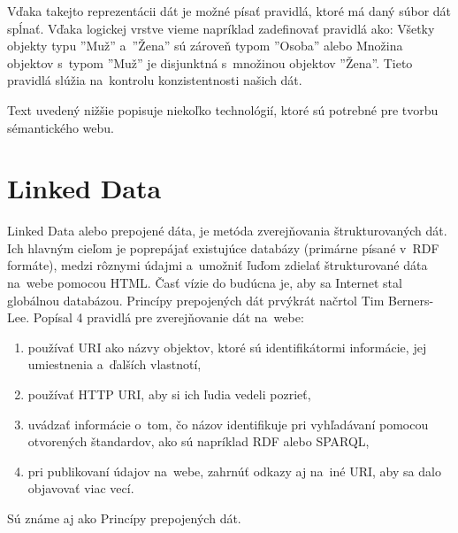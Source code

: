\documentclass[12pt, a4paper, oneside]{book}
\begin{document}
Vďaka takejto reprezentácii dát je možné písať pravidlá, ktoré má daný súbor dát spĺnať. Vďaka logickej vrstve vieme napríklad zadefinovať pravidlá ako: Všetky objekty typu ''Muž'' a~''Žena'' sú zároveň typom ''Osoba'' alebo Množina objektov s~typom ''Muž'' je disjunktná s~množinou objektov ''Žena''. Tieto pravidlá slúžia na~kontrolu konzistentnosti našich dát.





Text uvedený nižšie popisuje niekoľko technológií, ktoré sú potrebné pre tvorbu sémantického webu.

\section{Linked Data}



Linked Data \cite{linkeddata} alebo prepojené dáta, je metóda zverejňovania štrukturovaných dát. Ich hlavným cieľom je poprepájať existujúce databázy (primárne písané v~RDF formáte), medzi rôznymi údajmi a~umožniť ľuďom zdielať štrukturované dáta na~webe pomocou HTML. Časť vízie do budúcna je, aby sa Internet stal globálnou databázou. Princípy prepojených dát prvýkrát načrtol Tim Berners-Lee. Popísal 4 pravidlá pre zverejňovanie dát na~webe:
\begin{enumerate}
  \item používať URI ako názvy objektov, ktoré sú identifikátormi informácie, jej umiestnenia a~ďalších vlastnotí,
  \item používať HTTP URI, aby si ich ľudia vedeli pozrieť,
  \item uvádzať informácie o~tom, čo názov identifikuje pri vyhľadávaní pomocou otvorených štandardov, ako sú napríklad RDF alebo SPARQL,
  \item pri publikovaní údajov na~webe, zahrnúť odkazy aj na~iné URI, aby sa dalo objavovať viac vecí.
\end{enumerate}
Sú známe aj ako Princípy prepojených dát.
\end{document}

